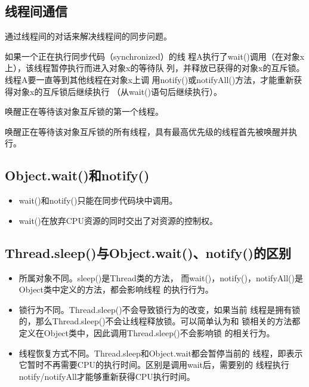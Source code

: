\subsection{线程间通信}

通过线程间的{\Red\hei 对话}来解决线程间的同步问题。


 {\small\kai 如果一个正在执行同步代码（synchronized）的线
  程A执行了wait()调用（在对象x上），该线程暂停执行而进入对象x的等待队
  列，并释放已获得的对象x的互斥锁。线程A要一直等到其他线程在对象x上调
  用notify()或notifyAll()方法，才能重新获得对象x的互斥锁后继续执行
  （从wait()语句后继续执行）。}

 {\small\kai 唤醒正在等待该对象互斥锁的第一个线程。}

 {\small\kai 唤醒正在等待该对象互斥锁的所有线程，具有最高优先级的线程首先被唤醒并执行。}
  

\subsection{Object.wait()和notify()}

\begin{itemize}
\item wait()和notify()只能在同步代码块中调用。
\item wait()在放弃CPU资源的同时交出了对资源的控制权。
\end{itemize}


\subsection{Thread.sleep()与Object.wait()、notify()的区别}
  
\begin{itemize}
\item 所属对象不同。sleep()是Thread类的方法，
  而wait()，notify()，notifyAll()是Object类中定义的方法，都会影响线程
  的执行行为。
\item 锁行为不同。Thread.sleep()不会导致锁行为的改变，如果当前
  线程是拥有锁的，那么Thread.sleep()不会让线程释放锁。可以简单认为和
  锁相关的方法都定义在Object类中，因此调用Thread.sleep()不会影响锁
  的相关行为。
\item 线程恢复方式不同。Thread.sleep和Object.wait都会暂停当前的
  线程，即表示它暂时不再需要CPU的执行时间。区别是调用wait后，需要别的
  线程执行notify/notifyAll才能够重新获得CPU执行时间。
\end{itemize}

